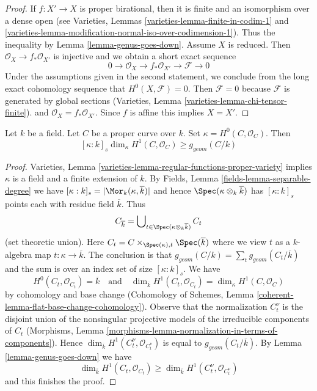 \begin{proof}
If $f : X' \to X$ is proper birational, then it is finite and
an isomorphism over a dense open (see
Varieties, Lemmas \ref{varieties-lemma-finite-in-codim-1} and
\ref{varieties-lemma-modification-normal-iso-over-codimension-1}).
Thus the inequality by Lemma \ref{lemma-genus-goes-down}.
Assume $X$ is reduced. Then $\mathcal{O}_X \to f_*\mathcal{O}_{X'}$
is injective and we obtain a short exact sequence
$$
0 \to \mathcal{O}_X \to f_*\mathcal{O}_{X'} \to \mathcal{F} \to 0
$$
Under the assumptions given in the second statement,
we conclude from the long exact cohomology sequence that
$H^0(X, \mathcal{F}) = 0$. Then $\mathcal{F} = 0$ because
$\mathcal{F}$ is generated by global sections
(Varieties, Lemma \ref{varieties-lemma-chi-tensor-finite}).
and $\mathcal{O}_X = f_*\mathcal{O}_{X'}$. Since $f$ is affine
this implies $X = X'$.
\end{proof}

\begin{lemma}
\label{lemma-bound-geometric-genus-curve}
Let $k$ be a field. Let $C$ be a proper curve over $k$.
Set $\kappa = H^0(C, \mathcal{O}_C)$. Then
$$
[\kappa : k]_s \dim_\kappa H^1(C, \mathcal{O}_C) \geq g_{geom}(C/k)
$$
\end{lemma}

\begin{proof}
Varieties, Lemma \ref{varieties-lemma-regular-functions-proper-variety}
implies $\kappa$ is a field and a finite extension of $k$.
By Fields, Lemma \ref{fields-lemma-separable-degree}
we have $[\kappa : k]_s = |\Mor_k(\kappa, \overline{k})|$
and hence $\Spec(\kappa \otimes_k \overline{k})$ has
$[\kappa : k]_s$ points each with residue field $\overline{k}$.
Thus
$$
C_{\overline{k}} =
\bigcup\nolimits_{t \in \Spec(\kappa \otimes_k \overline{k})} C_t
$$
(set theoretic union). Here
$C_t = C \times_{\Spec(\kappa), t} \Spec(\overline{k})$ where
we view $t$ as a $k$-algebra map $t : \kappa \to \overline{k}$.
The conclusion is that $g_{geom}(C/k) = \sum_t g_{geom}(C_t/\overline{k})$
and the sum is over an index set of size $[\kappa : k]_s$.
We have
$$
H^0(C_t, \mathcal{O}_{C_t}) = \overline{k}
\quad\text{and}\quad
\dim_{\overline{k}} H^1(C_t, \mathcal{O}_{C_t}) =
\dim_\kappa H^1(C, \mathcal{O}_C)
$$
by cohomology and base change
(Cohomology of Schemes, Lemma \ref{coherent-lemma-flat-base-change-cohomology}).
Observe that the normalization $C_t^\nu$ is the disjoint
union of the nonsingular projective models of the
irreducible components of $C_t$
(Morphisms, Lemma \ref{morphisms-lemma-normalization-in-terms-of-components}).
Hence $\dim_{\overline{k}} H^1(C_t^\nu, \mathcal{O}_{C_t^\nu})$
is equal to $g_{geom}(C_t/\overline{k})$.
By Lemma \ref{lemma-genus-goes-down} we have
$$
\dim_{\overline{k}} H^1(C_t, \mathcal{O}_{C_t}) \geq
\dim_{\overline{k}} H^1(C_t^\nu, \mathcal{O}_{C_t^\nu})
$$
and this finishes the proof.
\end{proof}


